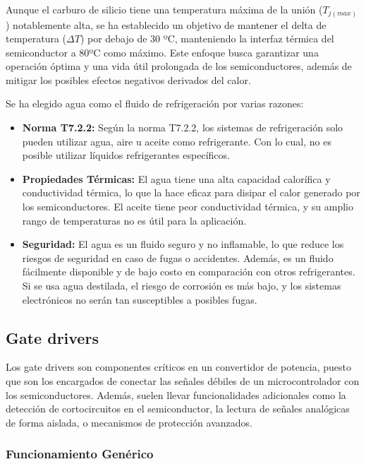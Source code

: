 Aunque el carburo de silicio tiene una temperatura máxima de la unión (\(T_{j(max)}\)) notablemente alta, se ha establecido un objetivo de mantener el delta de temperatura (\(\Delta T\)) por debajo de 30 ºC, manteniendo la interfaz térmica del semiconductor a 80ºC como máximo. Este enfoque busca garantizar una operación óptima y una vida útil prolongada de los semiconductores, además de mitigar los posibles efectos negativos derivados del calor.

Se ha elegido agua como el fluido de refrigeración por varias razones:

\begin{itemize}
	\item \textbf{Norma T7.2.2:} Según la norma T7.2.2, los sistemas de refrigeración solo pueden utilizar agua, aire u aceite como refrigerante. Con lo cual, no es posible utilizar líquidos refrigerantes específicos.
	
	\item \textbf{Propiedades Térmicas:} El agua tiene una alta capacidad calorífica y conductividad térmica, lo que la hace eficaz para disipar el calor generado por los semiconductores. El aceite tiene peor conductividad térmica, y su amplio rango de temperaturas no es útil para la aplicación.
	
	\item \textbf{Seguridad:} El agua es un fluido seguro y no inflamable, lo que reduce los riesgos de seguridad en caso de fugas o accidentes. Además, es un fluido fácilmente disponible y de bajo costo en comparación con otros refrigerantes. Si se usa agua destilada, el riesgo de corrosión es más bajo, y los sistemas electrónicos no serán tan susceptibles a posibles fugas.
	
\end{itemize}


\subsection{Gate drivers}

Los gate drivers son componentes críticos en un convertidor de potencia, puesto que son los encargados de conectar las señales débiles de un microcontrolador con los semiconductores. Además, suelen llevar funcionalidades adicionales como la detección de cortocircuitos en el semiconductor, la lectura de señales analógicas de forma aislada, o mecanismos de protección avanzados.

\subsubsection{Funcionamiento Genérico}

